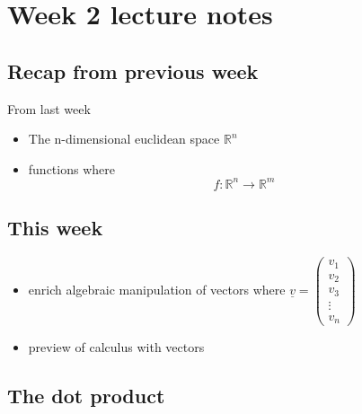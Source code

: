 \chapter{Week 2 lecture notes}

\section{Recap from previous week}
From last week
\begin{itemize}
 \item The n-dimensional euclidean space $\mathbb{R}^n$
 \item functions where \[
   f : \mathbb{R}^n \rightarrow \mathbb{R}^m
 \]  
\end{itemize}

\section{This week}

\begin{itemize}
   \item   enrich algebraic manipulation of vectors where $ \underline{v} = \begin{pmatrix} v_1 \\v_2 \\ v_3 \\\vdots \\ v_n \end{pmatrix} $ 
   \item preview of calculus with vectors
  
\end{itemize}


\section{The dot product}

